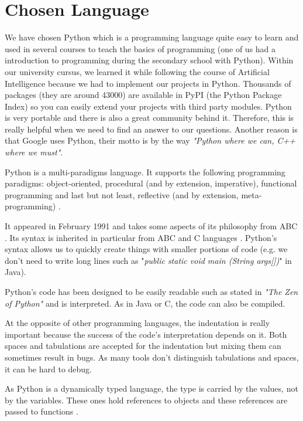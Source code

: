 \section{Chosen Language}
We have chosen Python which is a programming language quite easy to learn and used in several courses to teach the basics of programming (one of us had a introduction to programming during the secondary school with Python). Within our university cursus, we learned it while following the course of Artificial Intelligence because we had to implement our projects in Python. Thousands of packages (they are around 43000) are available in PyPI (the Python Package Index) so you can easily extend your projects with third party modules. Python is very portable and there is also a great community behind it. Therefore, this is really helpful when we need to find an answer to our questions. Another reason is that Google uses Python, their motto is by the way \textit{"Python where we can, C++ where we must"}.
\newline

Python is a multi-paradigms language. It supports the following programming paradigms: object-oriented, procedural (and by extension, imperative), functional programming and last but not least, reflective (and by extension, meta-programming) \cite{martelli2006python, python_doc_functional}.

It appeared in February 1991 and takes some aspects of its philosophy from ABC \cite{python_doc_why}. Its syntax is inherited in particular from ABC and C languages \cite{wikipediaEN_history_python}. Python's syntax allows us to quickly create things with smaller portions of code (e.g. we don't need to write long lines such as "\textit{public static void main (String args[])}" in Java).

Python's code has been designed to be easily readable such as stated in \textit{"The Zen of Python"} \cite{ZenPython} and is interpreted. As in Java or C, the code can also be compiled.

At the opposite of other programming languages, the indentation is really important because the success of the code's interpretation depends on it. Both spaces and tabulations are accepted for the indentation but mixing them can sometimes result in bugs. As many tools don't distinguish tabulations and spaces, it can be hard to debug.

As Python is a dynamically typed language, the type is carried by the values, not by the variables. These ones hold references to objects and these references are passed to functions \cite{wikipediaEN_python_syntax_semantics}.

